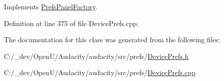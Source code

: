 Implements \hyperlink{class_prefs_panel_factory_a4814184d6050665a43f4929caa73aa0c}{Prefs\+Panel\+Factory}.



Definition at line 375 of file Device\+Prefs.\+cpp.



The documentation for this class was generated from the following files\+:\begin{DoxyCompactItemize}
\item 
C\+:/\+\_\+dev/\+Open\+U/\+Audacity/audacity/src/prefs/\hyperlink{_device_prefs_8h}{Device\+Prefs.\+h}\item 
C\+:/\+\_\+dev/\+Open\+U/\+Audacity/audacity/src/prefs/\hyperlink{_device_prefs_8cpp}{Device\+Prefs.\+cpp}\end{DoxyCompactItemize}
